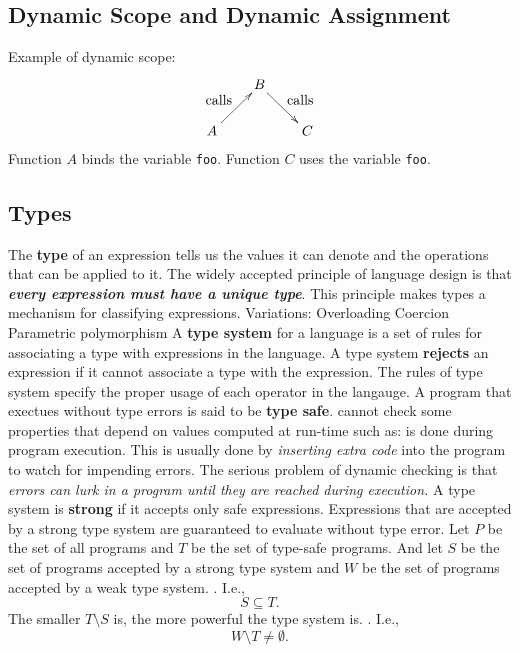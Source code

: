 \documentclass{article}
\begin{document}
\subsection{Dynamic Scope and Dynamic Assignment}
\bit
\w Example of dynamic scope:
\[\xymatrix@-0.3pc{
	& B \ar[rd]^{\mbox{calls}}& \\
	A \ar[ru]^{\mbox{calls}}& & C
}\]	
	\bit
	\w Function $A$ binds the variable {\tt{}foo}.
	\w Function $C$ uses the variable {\tt{}foo}.
	\eit
\eit

\subsection{Types}
\bit
\w The {\bf{}type} of an expression tells us the values it can denote and
	the operations that can be applied to it.
\w The widely accepted principle of language design is
	that {\sl\bfseries{}every expression must have a unique type\/}.
	\bit
	\w This principle makes types a mechanism for classifying
		expressions.
	\w Variations:
		\ben 
		\w Overloading
		\w Coercion
		\w Parametric polymorphism	
		\een
	\eit
\w A {\bf{}type system} for a language is a set of rules for associating
	a type with expressions in the language.
	\bit
	\w A type system {\bf{}rejects} an expression if it cannot
		associate a type with the expression.
	\eit
\w The rules of type system specify the proper usage of each operator
	in the langauge.
\w A program that exectues without type errors is said to be
	{\bf{}type safe}.
 cannot check some properties that
	depend on values computed at run-time such as:
	\bit
	\eit
{} is done during program execution.
	\bit
	\w This is usually done by {\em{}inserting extra code\/} into
	the program to watch for impending errors.
	\w The serious problem of dynamic checking is that {\em{}errors can
		lurk in a program until they are reached during execution.\/}
	\eit
\w A type system is {\bf{}strong} if it accepts only safe expressions.
	\bit
	\w Expressions that are accepted by a strong type system are
		guaranteed to evaluate without type error.
	\eit
\w Let $P$ be the set of all programs and $T$ be the set of type-safe
	programs. And let $S$ be the set of programs accepted by a 
	strong type system and $W$ be the set of programs accepted by
	a weak type system.
	\bit
	. I.e.,
		\[ S \subseteq T.\]
	   The smaller $T \setminus S$ is, the more powerful 
		the type system is.
	.
		I.e.,
		\[  W \setminus T \ne \emptyset.\]
	\eit
\eit
\end{document}
